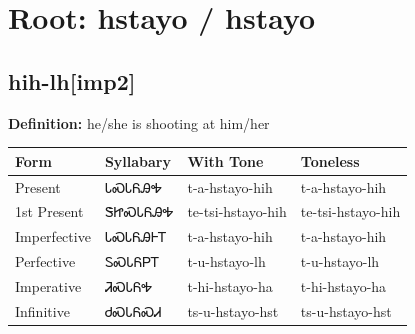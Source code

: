 \documentclass{article}%
\begin{document}
%
\normalsize%
\section*{Root: hstayo / hstayo}%
\subsection*{hih-lh[imp2]}%
\textbf{Definition: }%
he/she is shooting at him/her%
\\[0.5em]%
\begin{tabular}{|l|l|l|l|}%
\hline%
\textbf{Form}&\textbf{Syllabary}&\textbf{With Tone}&\textbf{Toneless}\\%
\hline%
Present&ᏓᏍᏓᏲᎯᎭ&t{-}a{-}hstayo{-}hih&t{-}a{-}hstayo{-}hih\\%
1st Present&ᏕᏥᏍᏓᏲᎯᎭ&te{-}tsi{-}hstayo{-}hih&te{-}tsi{-}hstayo{-}hih\\%
Imperfective&ᏓᏍᏓᏲᎯᎰᎢ&t{-}a{-}hstayo{-}hih&t{-}a{-}hstayo{-}hih\\%
Perfective&ᏚᏍᏓᏲᏢᎢ&t{-}u{-}hstayo{-}lh&t{-}u{-}hstayo{-}lh\\%
Imperative&ᏘᏍᏓᏲᎭ&t{-}hi{-}hstayo{-}ha&t{-}hi{-}hstayo{-}ha\\%
Infinitive&ᏧᏍᏓᏲᏍᏗ&ts{-}u{-}hstayo{-}hst&ts{-}u{-}hstayo{-}hst\\%
\hline%
\end{tabular}%
\\[1em]%
\end{document}
